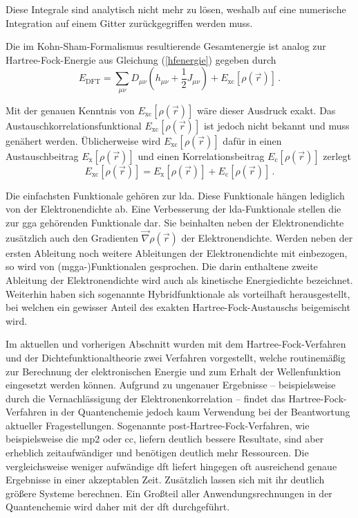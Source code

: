 Diese Integrale sind analytisch nicht mehr zu lösen, weshalb auf eine numerische Integration auf einem Gitter zurückgegriffen werden muss. 

Die im Kohn-Sham-Formalismus resultierende Gesamtenergie ist analog zur Hartree-Fock-Energie aus Gleichung (\ref{hfenergie}) gegeben durch
\begin{equation}
E_{\textrm{DFT}}=\sum_{\mu\nu}D_{\mu\nu}(h_{\mu\nu}+\frac{1}{2}J_{\mu\nu})+E_{\textrm{xc}}[\rho(\vec{r})]\, . 
\label{dftenergie}
\end{equation}

Mit der genauen Kenntnis von $E_{\textrm{xc}}[\rho(\vec{r})]$ wäre dieser Ausdruck exakt. Das Austauschkorrelationsfunktional $E_{\textrm{xc}}[\rho(\vec{r})]$ ist jedoch nicht bekannt und muss genähert werden. Üblicherweise wird $E_{\textrm{xc}}[\rho(\vec{r})]$ dafür in einen Austauschbeitrag $E_{\textrm{x}}[\rho(\vec{r})]$ und einen Korrelationsbeitrag $E_{\textrm{c}}[\rho(\vec{r})]$ zerlegt
\begin{equation}
E_{\textrm{xc}}[\rho(\vec{r})] = E_{\textrm{x}}[\rho(\vec{r})] + E_{\textrm{c}}[\rho(\vec{r})]\, .
\end{equation}

Die einfachsten Funktionale gehören zur \ac{lda}. Diese Funktionale hängen lediglich von der Elektronendichte ab. Eine Verbesserung der \ac{lda}-Funktionale stellen die zur \ac{gga} gehörenden Funktionale dar. Sie beinhalten neben der Elektronendichte zusätzlich auch den Gradienten $\vec{\nabla}\rho(\vec{r})$ der Elektronendichte. Werden neben der ersten Ableitung noch weitere Ableitungen der Elektronendichte mit einbezogen, so wird von \mbox{(\acs{mgga}-)}Funktionalen gesprochen. Die darin enthaltene zweite Ableitung der Elektronendichte wird auch als kinetische Energiedichte bezeichnet. Weiterhin haben sich sogenannte Hybridfunktionale als vorteilhaft herausgestellt, bei welchen ein gewisser Anteil des exakten Hartree-Fock-Austauschs beigemischt wird.


\bigskip
Im aktuellen und vorherigen Abschnitt wurden mit dem Hartree-Fock-Verfahren und der Dichtefunktionaltheorie zwei Verfahren vorgestellt, welche routinemäßig zur Berechnung der elektronischen Energie und zum Erhalt der Wellenfunktion eingesetzt werden können. Aufgrund zu ungenauer Ergebnisse -- beispielsweise durch die Vernachlässigung der Elektronenkorrelation -- findet das Hartree-Fock-Verfahren in der Quantenchemie jedoch kaum Verwendung bei der Beantwortung aktueller Fragestellungen. Sogenannte post-Hartree-Fock-Verfahren, wie beispielsweise die \acl{mp2} oder \acl{cc}, liefern deutlich bessere Resultate, sind aber erheblich zeitaufwändiger und benötigen deutlich mehr Ressourcen. Die vergleichsweise weniger aufwändige \ac{dft} liefert hingegen oft ausreichend genaue Ergebnisse in einer akzeptablen Zeit. Zusätzlich lassen sich mit ihr deutlich größere Systeme berechnen. Ein Großteil aller Anwendungsrechnungen in der Quantenchemie wird daher mit der \ac{dft} durchgeführt. 

